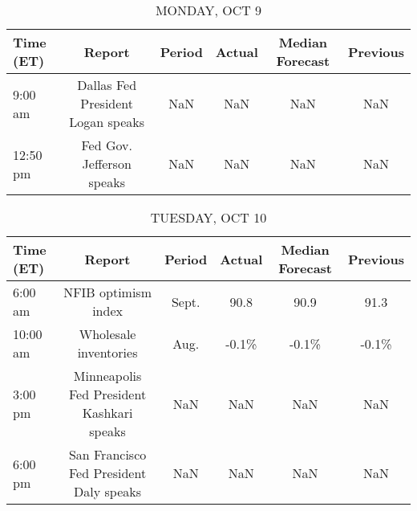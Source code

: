 \documentclass{article}%
\begin{document}
%
\normalsize%


\begin{table}[htbp]%
\caption{MONDAY, OCT 9}%
\centering%
\begin{adjustbox}{width=1\textwidth}%
\begin{tabular}{lccccc}
\toprule
Time (ET) &                            Report & Period & Actual & Median Forecast & Previous \\
\midrule
  9:00 am & Dallas Fed President Logan speaks &    NaN &    NaN &             NaN &      NaN \\
 12:50 pm &         Fed Gov. Jefferson speaks &    NaN &    NaN &             NaN &      NaN \\
\bottomrule
\end{tabular}
%
\end{adjustbox}%
\end{table}

%


\begin{table}[htbp]%
\caption{TUESDAY, OCT 10}%
\centering%
\begin{adjustbox}{width=1\textwidth}%
\begin{tabular}{lccccc}
\toprule
Time (ET) &                                    Report & Period & Actual & Median Forecast & Previous \\
\midrule
  6:00 am &                       NFIB optimism index &  Sept. &   90.8 &            90.9 &     91.3 \\
 10:00 am &                     Wholesale inventories &   Aug. &  -0.1\% &           -0.1\% &    -0.1\% \\
  3:00 pm & Minneapolis Fed President Kashkari speaks &    NaN &    NaN &             NaN &      NaN \\
  6:00 pm &   San Francisco Fed President Daly speaks &    NaN &    NaN &             NaN &      NaN \\
\bottomrule
\end{tabular}
%
\end{adjustbox}%
\end{table}

%
\end{document}

